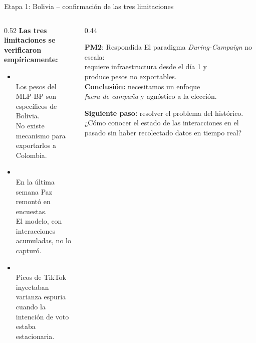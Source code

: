 \begin{frame}{Etapa 1: Bolivia -- confirmación de las tres limitaciones}
  \begin{columns}[T]
    \begin{column}{0.52\textwidth}
      \textbf{Las tres limitaciones se verificaron empíricamente:}
      \begin{itemize}
        \item {}\\
              Los pesos del MLP-BP son específicos de Bolivia.\\
              No existe mecanismo para exportarlos a Colombia.
        \vspace{0.3em}
        \item {}\\
              En la última semana Paz remontó en encuestas.\\
              El modelo, con interacciones acumuladas, no lo capturó.
        \vspace{0.3em}
        \item {}\\
              Picos de TikTok inyectaban varianza espuria\\
              cuando la intención de voto estaba estacionaria.
      \end{itemize}
    \end{column}
    \begin{column}{0.44\textwidth}
      \begin{alertblock}{\textbf{PM2}: Respondida}
        El paradigma \textit{During-Campaign} no escala:\\
        requiere infraestructura desde el día 1 y\\
        produce pesos no exportables.\\[0.4em]
        \textbf{Conclusión:} necesitamos un enfoque\\
        \textit{fuera de campaña} y agnóstico a la elección.
      \end{alertblock}
      \vspace{0.4em}
      \small
      \textbf{Siguiente paso:} resolver el problema del histórico.
      ¿Cómo conocer el estado de las interacciones en el pasado sin
      haber recolectado datos en tiempo real?
    \end{column}
  \end{columns}
\end{frame}
